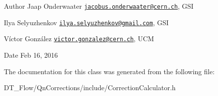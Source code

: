 \begin{DoxyAuthor}{Author}
Jaap Onderwaater \href{mailto:jacobus.onderwaater@cern.ch}{\tt jacobus.\+onderwaater@cern.\+ch}, G\+SI 

Ilya Selyuzhenkov \href{mailto:ilya.selyuzhenkov@gmail.com}{\tt ilya.\+selyuzhenkov@gmail.\+com}, G\+SI 

Víctor González \href{mailto:victor.gonzalez@cern.ch}{\tt victor.\+gonzalez@cern.\+ch}, U\+CM 
\end{DoxyAuthor}
\begin{DoxyDate}{Date}
Feb 16, 2016 
\end{DoxyDate}


The documentation for this class was generated from the following file\+:\begin{DoxyCompactItemize}
\item 
D\+T\+\_\+\+Flow/\+Qn\+Corrections/include/Correction\+Calculator.\+h\end{DoxyCompactItemize}
